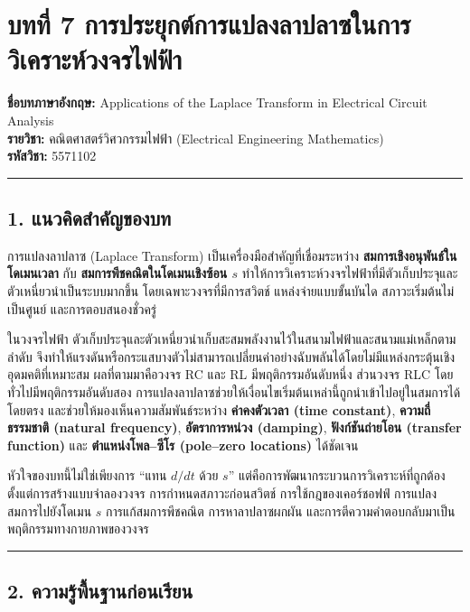 \section{บทที่ 7 การประยุกต์การแปลงลาปลาซในการวิเคราะห์วงจรไฟฟ้า}

\textbf{ชื่อบทภาษาอังกฤษ:} Applications of the Laplace Transform in Electrical Circuit Analysis\\
\textbf{รายวิชา:} คณิตศาสตร์วิศวกรรมไฟฟ้า (Electrical Engineering Mathematics)\\
\textbf{รหัสวิชา:} 5571102

\par\noindent\rule{\textwidth}{0.4pt}\par

\subsection{1. แนวคิดสำคัญของบท}

การแปลงลาปลาซ (Laplace Transform) เป็นเครื่องมือสำคัญที่เชื่อมระหว่าง \textbf{สมการเชิงอนุพันธ์ในโดเมนเวลา} กับ \textbf{สมการพีชคณิตในโดเมนเชิงซ้อน $s$} ทำให้การวิเคราะห์วงจรไฟฟ้าที่มีตัวเก็บประจุและตัวเหนี่ยวนำเป็นระบบมากขึ้น โดยเฉพาะวงจรที่มีการสวิตช์ แหล่งจ่ายแบบขั้นบันได สภาวะเริ่มต้นไม่เป็นศูนย์ และการตอบสนองชั่วครู่

ในวงจรไฟฟ้า ตัวเก็บประจุและตัวเหนี่ยวนำเก็บสะสมพลังงานไว้ในสนามไฟฟ้าและสนามแม่เหล็กตามลำดับ จึงทำให้แรงดันหรือกระแสบางตัวไม่สามารถเปลี่ยนค่าอย่างฉับพลันได้โดยไม่มีแหล่งกระตุ้นเชิงอุดมคติที่เหมาะสม ผลที่ตามมาคือวงจร RC และ RL มีพฤติกรรมอันดับหนึ่ง ส่วนวงจร RLC โดยทั่วไปมีพฤติกรรมอันดับสอง การแปลงลาปลาซช่วยให้เงื่อนไขเริ่มต้นเหล่านี้ถูกนำเข้าไปอยู่ในสมการได้โดยตรง และช่วยให้มองเห็นความสัมพันธ์ระหว่าง \textbf{ค่าคงตัวเวลา (time constant)}, \textbf{ความถี่ธรรมชาติ (natural frequency)}, \textbf{อัตราการหน่วง (damping)}, \textbf{ฟังก์ชันถ่ายโอน (transfer function)} และ \textbf{ตำแหน่งโพล–ซีโร (pole–zero locations)} ได้ชัดเจน

หัวใจของบทนี้ไม่ใช่เพียงการ “แทน $d/dt$ ด้วย $s$” แต่คือการพัฒนากระบวนการวิเคราะห์ที่ถูกต้อง ตั้งแต่การสร้างแบบจำลองวงจร การกำหนดสภาวะก่อนสวิตช์ การใช้กฎของเคอร์ชอฟฟ์ การแปลงสมการไปยังโดเมน $s$ การแก้สมการพีชคณิต การหาลาปลาซผกผัน และการตีความคำตอบกลับมาเป็นพฤติกรรมทางกายภาพของวงจร

\par\noindent\rule{\textwidth}{0.4pt}\par

\subsection{2. ความรู้พื้นฐานก่อนเรียน}

